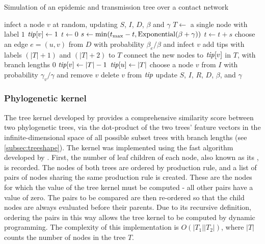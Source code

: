 \begin{algorithm}
  \label{alg:nettree}
  \caption{Simulation of an epidemic and transmission tree over a contact network}
  \begin{algorithmic}
    \State infect a node $v$ at random, updating $S$, $I$, $D$, $\beta$ and $\gamma$
    \State $T \gets$ a single node with label $1$
    \State $\mathit{tip}[v] \gets 1$
    \State $t \gets 0$
      \State $s \gets \min(t_{\max} - t, \operatorname{Exponential}(\beta + \gamma))$
      \EndFor
      \State $t \gets t + s$
          \State choose an edge $e = (u, v)$ from $D$ with probability $\beta_e / \beta$
                 and infect $v$
          \State add tips with labels $(|T|+1)$ and $(|T|+2)$ to $T$
          \State connect the new nodes to $\mathit{tip}[v]$ in $T$, with branch lengths $0$
          \State $\mathit{tip}[v] \gets |T|-1$
          \State $\mathit{tip}[u] \gets |T|$
        \Else
          \State choose a node $v$ from $I$ with probability $\gamma_v / \gamma$
                 and remove $v$
          \State delete $v$ from $\mathit{tip}$
        \EndIf
        \State update $S$, $I$, $R$, $D$, $\beta$, and $\gamma$
      \EndIf
    \EndWhile
  \end{algorithmic}
\end{algorithm}

\subsubsection{Phylogenetic kernel}

The tree kernel developed by \textcite{poon2013mapping} provides a
comprehensive similarity score between two phylogenetic trees, via the
dot-product of the two trees' feature vectors in the infinite-dimensional space
of all possible subset trees with branch lengths (see \cref{subsec:treeshape}).
The kernel was implemented using the fast algorithm developed by
\textcite{moschitti2006making}. First, the number of leaf children of each
node, also known as its , is recorded. The nodes of both
trees are ordered by production rule, and a list of pairs of nodes sharing the
same production rule is created. These are the nodes for which the value of the
tree kernel must be computed - all other pairs have a value of zero. The pairs
to be compared are then re-ordered so that the child nodes are always evaluated
before their parents. Due to its recursive definition, ordering the pairs in
this way allows the tree kernel to be computed by dynamic programming. The
complexity of this implementation is $O(|T_1||T_2|)$, where $|T|$ counts the
number of nodes in the tree $T$.

